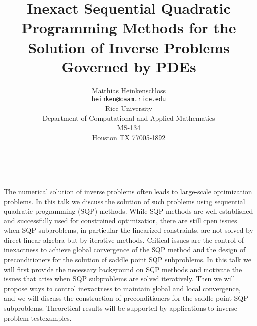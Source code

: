 \documentclass[11pt]{article}
\date{ ~ \hspace{-4mm}}
\title{Inexact Sequential Quadratic Programming Methods for the Solution of Inverse Problems Governed by PDEs  }
\author{Matthias Heinkenschloss \\ {\tt  heinken@caam.rice.edu} \\ Rice University  \\  Department of Computational and Applied Mathematics  \\  MS-134  \\  Houston TX 77005-1892}
\begin{document}
\maketitle
\thispagestyle{empty}





 



The numerical solution of inverse problems often leads to
large-scale optimization problems.
In this talk we discuss the solution of such problems
using sequential quadratic programming (SQP) methods.
While SQP methods are well established and successfully
used for constrained optimization, there are still open
issues when SQP subproblems, in particular the linearized
constraints, are not solved by direct linear algebra but
by iterative methods. Critical issues are the control of inexactness
to achieve global convergence of the SQP method and the design
of preconditioners for the solution of saddle point SQP subproblems.
 \newline 
In this talk we will first provide the necessary background on SQP
methods
and motivate the issues that arise when SQP subproblems are solved
iteratively.
Then we will propose ways to control inexactness to maintain global
and local convergence, and we will discuss the construction of
preconditioners
for the saddle point SQP subproblems. Theoretical results will be
supported by applications to inverse problem testexamples.
\end{document}
